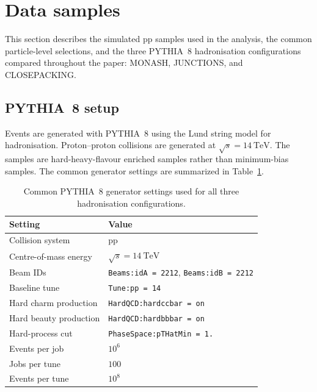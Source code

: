\FloatBarrier
\section{Data samples}
\label{Sec:Model}


This section describes the simulated pp samples used in the analysis, the common particle-level selections, and the three PYTHIA~8 hadronisation configurations compared throughout the paper: MONASH, JUNCTIONS, and CLOSEPACKING.

\subsection{PYTHIA~8 setup}
\label{sec:pythia-setup}

Events are generated with PYTHIA~8 using the Lund string model for hadronisation.  Proton--proton collisions are generated at $\sqrt{s} = 14~\mathrm{TeV}$. The samples are hard-heavy-flavour enriched samples rather than minimum-bias samples.  
The common generator settings are summarized in Table~\ref{tab:generator-settings}.

\begin{table}[tbp]
\centering
\label{tab:generator-settings}
\begin{tabular}{ll}
\toprule
Setting & Value \\
\midrule
Collision system & pp \\
Centre-of-mass energy & $\sqrt{s}=14~\mathrm{TeV}$ \\
Beam IDs & \texttt{Beams:idA = 2212}, \texttt{Beams:idB = 2212} \\
Baseline tune & \texttt{Tune:pp = 14} \\
Hard charm production & \texttt{HardQCD:hardccbar = on} \\
Hard beauty production & \texttt{HardQCD:hardbbbar = on} \\
Hard-process cut & \texttt{PhaseSpace:pTHatMin = 1.} \\
Events per job & $10^{6}$ \\
Jobs per tune & $100$ \\
Events per tune & $10^{8}$ \\
\bottomrule
\end{tabular}
\caption{Common PYTHIA~8 generator settings used for all three hadronisation configurations.}
\end{table}

